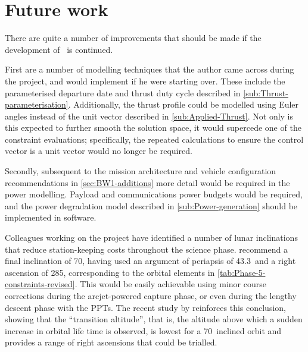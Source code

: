 \section{Future work} \label{sec:Future-work}

There are quite a number of improvements that should be made if the development of \BW\ is continued. 

First are a number of modelling techniques that the author came across during the project, and would implement if he were starting over. These include the parameterised departure date and thrust duty cycle described in \autoref{sub:Thrust-parameterisation}. Additionally, the thrust profile could be modelled using Euler angles instead of the unit vector described in \autoref{sub:Applied-Thrust}. Not only is this expected to further smooth the solution space, it would supercede one of the constraint evaluations; specifically, the repeated calculations to ensure the control vector is  a unit vector would no longer be required.

Secondly, subsequent to the mission architecture and vehicle configuration recommendations in \autoref{sec:BW1-additions} more detail would be required in the power modelling. Payload and communications power budgets would be required, and the power degradation model described in \autoref{sub:Power-generation} should be implemented in software.


Colleagues working on the project have identified a number of lunar inclinations that reduce station-keeping costs throughout the science phase. \textcite{Zeile2010} recommend a final inclination of 70\degrees, having used an argument of periapsis of 43.3\degrees\ and a right ascension of 285\degrees, corresponding to the orbital elements in \autoref{tab:Phase-5-constraints-revised}. This would be easily achievable using minor course corrections during the arcjet-powered capture phase, or even during the lengthy descent phase with the PPTs. The recent study by \textcite[Figure 14a]{Gupta2011} reinforces this conclusion, showing that the \enquote{transition altitude}, that is, the altitude above which a sudden increase in orbital life time is observed, is lowest for a 70\degrees\ inclined orbit and provides a range of right ascensions that could be trialled.

